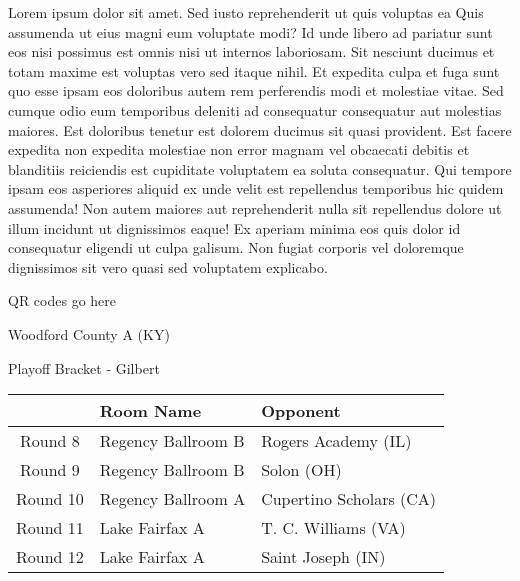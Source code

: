 \documentclass{article}%
\begin{document}
\vspace*{8pt}%
\linebreak%
\newline%
\newline%
Lorem ipsum dolor sit amet. Sed iusto reprehenderit ut quis voluptas ea Quis assumenda ut eius magni eum voluptate modi? Id unde libero ad pariatur sunt eos nisi possimus est omnis nisi ut internos laboriosam. Sit nesciunt ducimus et totam maxime est voluptas vero sed itaque nihil. Et expedita culpa et fuga sunt quo esse ipsam eos doloribus autem rem perferendis modi et molestiae vitae.\newline%
\newline%
Sed cumque odio eum temporibus deleniti ad consequatur consequatur aut molestias maiores. Est doloribus tenetur est dolorem ducimus sit quasi provident. Est facere expedita non expedita molestiae non error magnam vel obcaecati debitis et blanditiis reiciendis est cupiditate voluptatem ea soluta consequatur. Qui tempore ipsam eos asperiores aliquid ex unde velit est repellendus temporibus hic quidem assumenda!\newline%
\newline%
Non autem maiores aut reprehenderit nulla sit repellendus dolore ut illum incidunt ut dignissimos eaque! Ex aperiam minima eos quis dolor id consequatur eligendi ut culpa galisum. Non fugiat corporis vel doloremque dignissimos sit vero quasi sed voluptatem explicabo.\newline%
\newline%
%
\vspace*{30pt}%
\begin{center}%
\begin{Huge}%
QR codes go here%
\end{Huge}%
\end{center}%
\newpage%
\begin{center}%
\begin{Huge}%
Woodford County A (KY)%
\end{Huge}%
\vspace*{8pt}%
\linebreak%
\begin{Large}%
Playoff Bracket {-} Gilbert%
\end{Large}%
\end{center}%
%
\begin{tabularx}{\textwidth}{|c|Y|Y|}%
\hline%
&Room Name&Opponent\\%
\hline%
Round 8&Regency Ballroom B&Rogers Academy (IL)\\%
Round 9&Regency Ballroom B&Solon (OH)\\%
Round 10&Regency Ballroom A&Cupertino Scholars (CA)\\%
Round 11&Lake Fairfax A&T. C. Williams (VA)\\%
Round 12&Lake Fairfax A&Saint Joseph (IN)\\%
\hline%
\end{tabularx}%
\end{document}

